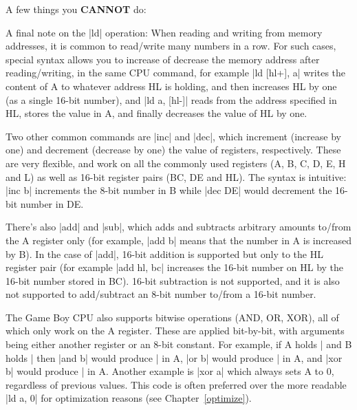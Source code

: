\documentclass[11pt]{book}
\begin{document}
A few things you \textbf{CANNOT} do:

A final note on the |ld| operation: When reading and writing from memory addresses, it is common to read/write many numbers in a row. For such cases, special syntax allows you to increase of decrease the memory address after reading/writing, in the same CPU command, for example |ld [hl+], a| writes the content of A to whatever address HL is holding, and then increases HL by one (as a single 16-bit number), and |ld a, [hl-]| reads from the address specified in HL, stores the value in A, and finally decreases the value of HL by one. 

Two other common commands are |inc| and |dec|, which increment (increase by one) and decrement (decrease by one) the value of registers, respectively. These are very flexible, and work on all the commonly used registers (A, B, C, D, E, H and L) as well as 16-bit register pairs (BC, DE and HL). The syntax is intuitive: |inc b| increments the 8-bit number in B while |dec DE| would decrement the 16-bit number in DE.

There’s also |add| and |sub|, which adds and subtracts arbitrary amounts to/from the A register only (for example, |add b| means that the number in A is increased by B). In the case of |add|, 16-bit addition is supported but only to the HL register pair (for example |add hl, bc| increases the 16-bit number on HL by the 16-bit number stored in BC). 16-bit subtraction is not supported, and it is also not supported to add/subtract an 8-bit number to/from a 16-bit number. 

The Game Boy CPU also supports bitwise operations (AND, OR, XOR), all of which only work on the A register. These are applied bit-by-bit, with arguments being either another register or an 8-bit constant. For example, if A holds |%
 and B holds |%
 then |and b| would produce |%
 in A, |or b| would produce |%
 in A, and |xor b| would produce |%
 in A. Another example is |xor a| which always sets A to 0, regardless of previous values. This code is often preferred over the more readable |ld a, 0| for optimization reasons (see Chapter~\ref{optimize}).
\end{document}
